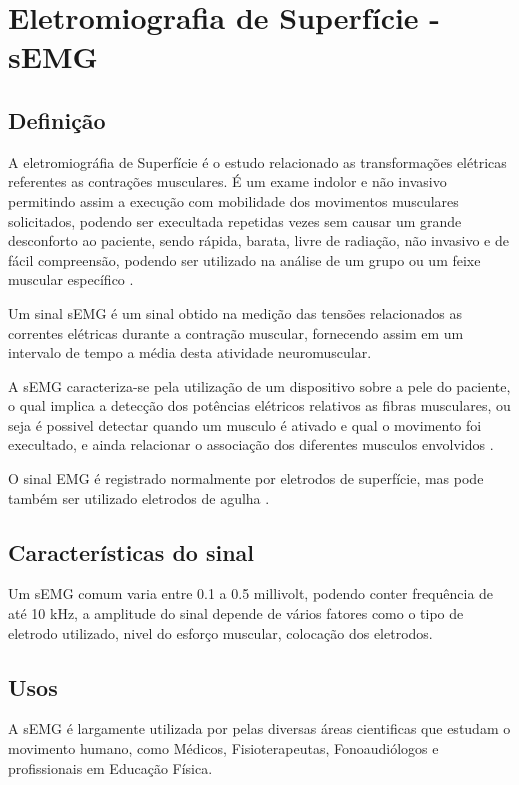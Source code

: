 \chapter{Eletromiografia de Superfície - sEMG}
\section{Definição}
A eletromiográfia de Superfície é o estudo relacionado as transformações elétricas referentes as contrações musculares. É um exame indolor e não invasivo permitindo assim a execução com mobilidade dos movimentos musculares solicitados, podendo ser execultada repetidas vezes sem causar um grande desconforto ao paciente, sendo rápida, barata, livre de radiação, não invasivo e de fácil compreensão, podendo ser utilizado na análise de um grupo ou um feixe muscular específico \cite{de2010eletromiografia}.

Um sinal sEMG é um sinal obtido na medição das tensões relacionados as correntes elétricas durante a contração muscular, fornecendo assim em um intervalo de tempo a média desta atividade neuromuscular\cite{reaz2006techniques}.

A sEMG caracteriza-se pela utilização de um dispositivo sobre a pele do paciente, o qual implica a detecção dos potências elétricos relativos as fibras musculares, ou seja é possivel detectar quando um musculo é ativado e qual o movimento foi execultado, e ainda relacionar o associação dos diferentes musculos envolvidos \cite{botelho2010avaliaccao}.

O sinal EMG é registrado normalmente por eletrodos de superfície, mas pode também ser utilizado eletrodos de agulha \cite{soderberg1984electromyography}.

\section{Características do sinal}

Um sEMG comum varia entre 0.1 a 0.5 millivolt, podendo conter frequência de até 10 kHz, a amplitude do sinal depende de vários fatores como o tipo de eletrodo utilizado, nivel do esforço muscular, colocação dos eletrodos.

\section{Usos}
A sEMG é largamente utilizada por pelas diversas áreas cientificas que estudam o movimento humano, como Médicos, Fisioterapeutas, Fonoaudiólogos e profissionais em Educação Física\cite{nascimento2012surface}.
